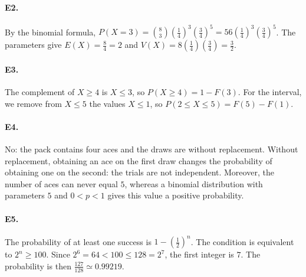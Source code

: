 \paragraph{E2.}By the binomial formula, $P(X=3)=\binom{8}{3}(\frac{1}{4})^3(\frac{3}{4})^5=56(\frac{1}{4})^3(\frac{3}{4})^5$. The parameters give $E(X)=\frac{8}{4}=2$ and $V(X)=8(\frac{1}{4})(\frac{3}{4})=\frac{3}{2}$.

\paragraph{E3.}The complement of $X\ge4$ is $X\le3$, so $P(X\ge4)=1-F(3)$. For the interval, we remove from $X\le5$ the values $X\le1$, so $P(2\le X\le5)=F(5)-F(1)$.

\paragraph{E4.}No: the pack contains four aces and the draws are without replacement. Without replacement, obtaining an ace on the first draw changes the probability of obtaining one on the second: the trials are not independent. Moreover, the number of aces can never equal $5$, whereas a binomial distribution with parameters $5$ and $0<p<1$ gives this value a positive probability.

\paragraph{E5.}The probability of at least one success is $1-(\frac{1}{2})^n$. The condition is equivalent to $2^n\ge100$. Since $2^6=64<100\le128=2^7$, the first integer is $7$. The probability is then $\frac{127}{128}\simeq\num{0,99219}$.

